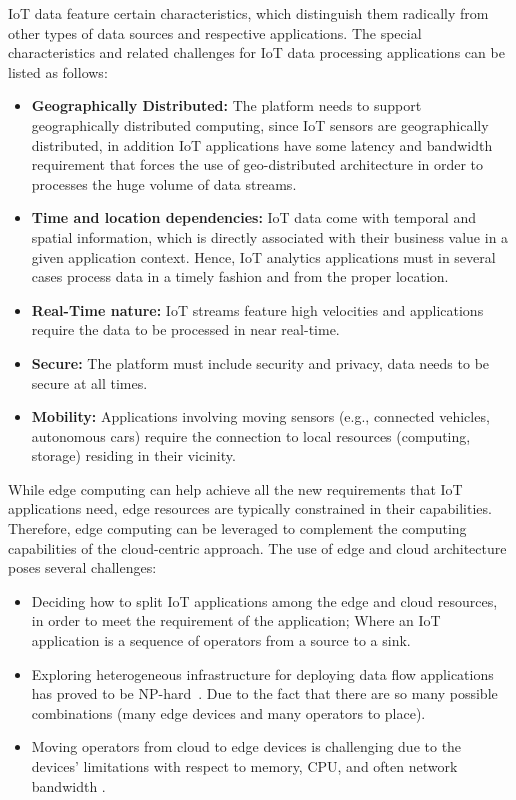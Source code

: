 IoT data feature certain characteristics, which distinguish them radically from other types of data sources and respective applications. The special characteristics and related challenges for IoT data processing applications can be listed as follows:

\begin{itemize}

\item{\textbf{Geographically Distributed:}} The platform needs to support geographically distributed computing, since 
IoT sensors are geographically distributed, in addition IoT applications have some latency and bandwidth requirement that forces the use of geo-distributed architecture in order to processes the huge volume of data streams.

\item{\textbf{Time and location dependencies:}} IoT data come with temporal and spatial information, which is directly associated with their business value in a given application context. Hence, IoT analytics applications must in several cases process data in a timely fashion and from the proper location.

\item{\textbf{Real-Time nature:}} IoT streams feature high velocities and applications require the data to be processed in near real-time. 

\item{\textbf{Secure:}} The platform must include security and privacy, data needs to be secure at all times.

\item{\textbf{Mobility:}} Applications involving moving sensors (e.g., connected vehicles, autonomous cars) require the connection to local resources (computing, storage) residing in their vicinity. 

\end{itemize}

While edge computing can help achieve all the new requirements that IoT applications need, edge resources are typically constrained in their capabilities. Therefore, edge computing can be leveraged to complement the computing capabilities of the cloud-centric approach. The use of edge and cloud architecture poses several challenges: 

\begin{itemize}
\item Deciding how to split IoT applications among the edge and cloud resources, in order to meet the requirement of the application; Where an IoT application is a sequence of operators from a source to a sink. 

\item Exploring heterogeneous infrastructure for deploying data flow applications has proved to be NP-hard~\cite{Benoit:2013}. Due to the fact that there are so many possible combinations (many edge devices and many operators to place). 
 
\item Moving operators from cloud to edge devices is challenging due to the devices' limitations with respect to memory, CPU, and often network bandwidth \cite{dias:2018:survey}.
\end{itemize}

